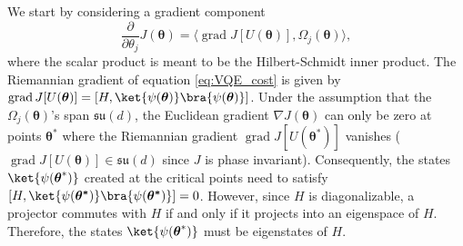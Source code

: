 \documentclass{article}
\renewcommand{\vec}[1]{\ensuremath{\boldsymbol{#1}}}
\begin{document}
We start by considering a gradient component
\begin{equation}
    \label{eq:cost_function_gradient}
    \frac{\partial}{\partial \theta_j} J(\vec{\theta}) = \langle \operatorname{grad}J[U(\vec{\theta})], \Omega_j(\vec{\theta}) \rangle,
\end{equation}
where the scalar product is meant to be the Hilbert-Schmidt inner product.
The Riemannian gradient of equation \eqref{eq:VQE_cost} is given by \(\operatorname{grad}J[U(\vec{\theta})] = [H, \ket{\psi(\vec{\theta})} \bra{\psi(\vec{\theta})}]\). Under the assumption that the \(\Omega_j(\vec{\theta})\)'s span \(\mathfrak{su}(d)\), the Euclidean gradient \(\nabla J(\vec{\theta})\) can only be zero at points \(\vec{\theta}^*\) where the Riemannian gradient \(\operatorname{grad}J[U(\vec{\theta}^*)]\) vanishes (\(\operatorname{grad} J[U(\vec{\theta})] \in \mathfrak{su}(d)\) since \(J\) is phase invariant). Consequently, the states \(\ket{\psi(\vec{\theta}^*)}\) created at the critical points need to satisfy \([H, \ket{\psi(\vec{\theta^*})} \bra{\psi(\vec{\theta^*})}] = 0\). However, since \(H\) is diagonalizable, a projector commutes with \(H\) if and only if it projects into an eigenspace of \(H\). Therefore, the states \(\ket{\psi(\vec{\theta}^*)}\) must be eigenstates of \(H\).
\end{document}
